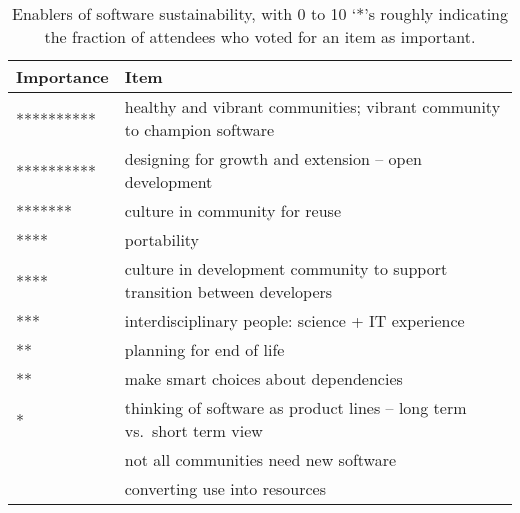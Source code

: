 \documentclass[11pt, oneside]{amsart}
\begin{document}
\begin{table*}[ht]
\centering
\caption{Enablers of software sustainability, with 0 to 10 `*'s roughly
indicating the fraction of attendees who voted for an item as important.}
\label{tb:software_sustainability_enablers}
  \begin{small}
  \begin{tabular}{ | p{1.65cm} | p{12.0cm} |}
    \hline
  Importance & Item \\ \hline \hline
********** & healthy and vibrant communities; vibrant community to champion software \\ \hline
********** & designing for growth and extension -- open development \\ \hline
******* & culture in community for reuse \\ \hline
**** & portability \\ \hline
**** & culture in development community to support transition between developers \\ \hline
*** & interdisciplinary people: science + IT experience \\ \hline
** & planning for end of life \\ \hline
** & make smart choices about dependencies \\ \hline
* & thinking of software as product lines -- long term vs.~short term view \\ \hline
 & not all communities need new software \\ \hline
 & converting use into resources \\ \hline
    \end{tabular}
    \end{small}
\end{table*}
\end{document}
